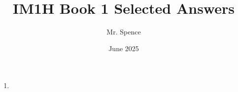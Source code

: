 \documentclass{article}
\title{IM1H Book 1 Selected Answers}
\author{Mr. Spence}
\date{June 2025}
\begin{document}
\maketitle

\begin{enumerate}

\item

\end{enumerate}
\end{document}
